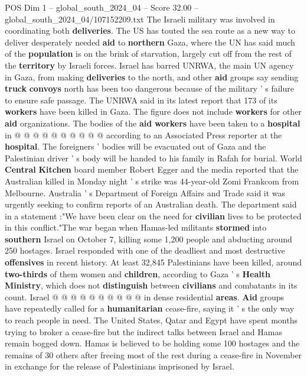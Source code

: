 \begin{textsample}{POS Dim 1 – global\_south\_2024\_04 – Score 32.00 – global\_south\_2024\_04/107152209.txt}
The Israeli military was involved in coordinating both \textbf{deliveries}.
The US has touted the sea route as a new way to deliver desperately needed \textbf{aid} to \textbf{northern} Gaza, where the UN has said much of the \textbf{population} is on the brink of starvation, largely cut off from the rest of the \textbf{territory} by Israeli forces.
Israel has barred UNRWA, the main UN agency in Gaza, from making \textbf{deliveries} to the north, and other \textbf{aid} groups say sending \textbf{truck} \textbf{convoys} north has been too dangerous because of the military ' s failure to ensure safe passage.
The UNRWA said in its latest report that 173 of its \textbf{workers} have been killed in Gaza.
The figure does not include \textbf{workers} for other \textbf{aid} organizations.
The bodies of the \textbf{aid} \textbf{workers} have been taken to a \textbf{hospital} in @ @ @ @ @ @ @ @ @ @ according to an Associated Press reporter at the \textbf{hospital}.
The foreigners ' bodies will be evacuated out of Gaza and the Palestinian driver ' s body will be handed to his family in Rafah for burial.
World \textbf{Central} \textbf{Kitchen} board member Robert Egger and the media reported that the Australian killed in Monday night ' s strike was 44-year-old Zomi Frankcom from Melbourne.
Australia ' s Department of Foreign Affairs and Trade said it was urgently seeking to confirm reports of an Australian death.
The department said in a statement :"We have been clear on the need for \textbf{civilian} lives to be protected in this conflict."The war began when Hamas-led militants \textbf{stormed} into \textbf{southern} Israel on October 7, killing some 1,200 people and abducting around 250 hostages.
Israel responded with one of the deadliest and most destructive \textbf{offensives} in recent history.
At least 32,845 Palestinians have been killed, around \textbf{two-thirds} of them women and \textbf{children}, according to Gaza ' s \textbf{Health} \textbf{Ministry}, which does not \textbf{distinguish} between \textbf{civilians} and combatants in its count.
Israel @ @ @ @ @ @ @ @ @ @ in dense residential \textbf{areas}. \textbf{Aid} groups have repeatedly called for a \textbf{humanitarian} cease-fire, saying it ' s the only way to reach people in need.
The United States, Qatar and Egypt have spent months trying to broker a cease-fire but the indirect talks between Israel and Hamas remain bogged down.
Hamas is believed to be holding some 100 hostages and the remains of 30 others after freeing most of the rest during a cease-fire in November in exchange for the release of Palestinians imprisoned by Israel.

\end{textsample}

